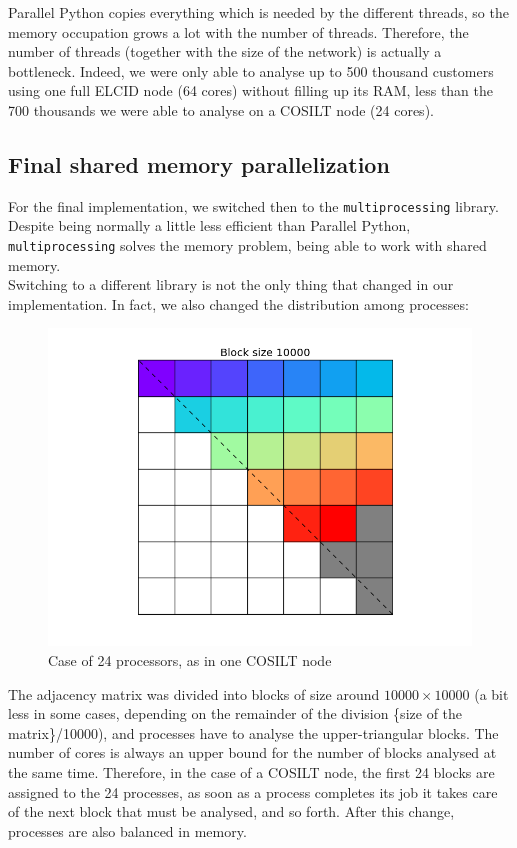 \documentclass[a4paper,11pt]{book}
\begin{document}
Parallel Python copies everything which is needed by the different threads,
so the memory occupation grows a lot with the number of threads.
Therefore, the number of threads (together with the size of the network) is
actually a bottleneck. Indeed, we were only able to analyse up to 500 thousand customers using one full ELCID node (64 cores) without filling up its RAM, less than the 700 thousands we were able to analyse on a COSILT node (24 cores).\\
\subsection{Final shared memory parallelization}
For the final implementation, we switched then to the \lstinline!multiprocessing! library. Despite being normally a little less efficient than Parallel Python,
\lstinline!multiprocessing! solves the memory problem, being able to work with
shared memory.\\

Switching to a different library is not the only thing that changed in our implementation. In fact, we also changed the distribution among processes:
\begin{figure}[H]\label{fig:blocks}
\centering
\includegraphics[height=8.415 cm,width=11.25 cm]{grid.png}
\caption{Case of 24 processors, as in one COSILT node}
\end{figure}
The adjacency matrix was divided into blocks of size around $10000\times 10000$ (a bit less in some cases, depending on the remainder of the division \{size of the matrix\}/10000), and processes have to analyse the upper-triangular blocks. The number of cores is always an upper bound for the number of blocks analysed at the same time. Therefore, in the case of a COSILT node, the first 24 blocks are assigned to the 24 processes, as soon as a process completes its job it takes care of the next block that must be analysed, and so forth. After this change, processes are also balanced in memory.\\
\end{document}
